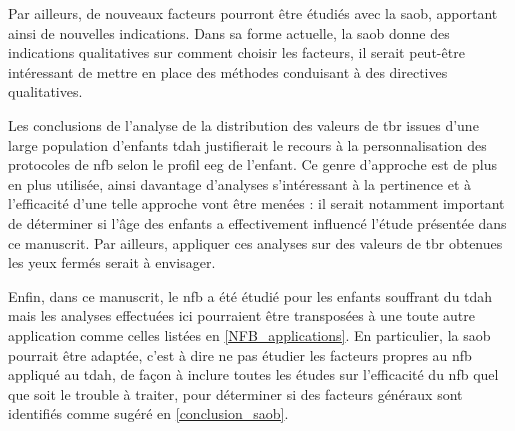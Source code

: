 Par ailleurs, de nouveaux facteurs pourront être étudiés avec la \gls{saob}, apportant ainsi de nouvelles  
indications. Dans sa forme actuelle, la \gls{saob} donne des indications qualitatives sur comment choisir les facteurs, il serait peut-être intéressant de mettre en place des
méthodes conduisant à des directives qualitatives.

Les conclusions de l'analyse de la distribution des valeurs de \gls{tbr} issues d'une large population d'enfants \gls{tdah} justifierait le recours à la 
personnalisation des protocoles de \gls{nfb} selon le profil \gls{eeg} de l'enfant. Ce genre d'approche est de plus en plus utilisée, ainsi davantage d'analyses s'intéressant
à la pertinence et à l'efficacité d'une telle approche vont être menées : il serait notamment important de déterminer si l'âge des enfants a effectivement influencé l'étude
présentée dans ce manuscrit. Par ailleurs, appliquer ces analyses sur des valeurs de \gls{tbr} obtenues les yeux fermés serait à envisager. 

Enfin, dans ce manuscrit, le \gls{nfb} a été étudié pour les enfants souffrant du \gls{tdah} mais les analyses effectuées ici pourraient être 
transposées à une toute autre application comme celles listées en \ref{NFB_applications}.
En particulier, la \gls{saob} pourrait être adaptée, c'est à dire ne pas étudier les facteurs propres au \gls{nfb} 
appliqué au \gls{tdah}, de façon à inclure toutes les études sur l'efficacité du \gls{nfb} 
quel que soit le trouble à traiter, pour déterminer si des facteurs généraux sont identifiés comme sugéré en \ref{conclusion_saob}. 
